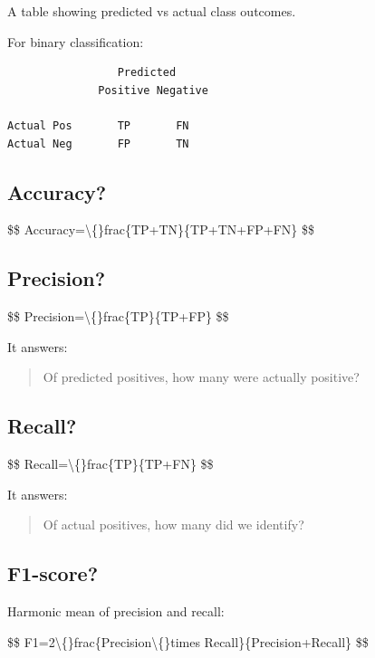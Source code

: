 A table showing predicted vs actual class outcomes.

For binary classification:

\begin{lstlisting}
                 Predicted
              Positive Negative

Actual Pos       TP       FN
Actual Neg       FP       TN
\end{lstlisting}

\medskip

\subsection{Accuracy?}

\$\$
Accuracy=\textbackslash\{\}frac\{TP+TN\}\{TP+TN+FP+FN\}
\$\$

\medskip

\subsection{Precision?}

\$\$
Precision=\textbackslash\{\}frac\{TP\}\{TP+FP\}
\$\$

It answers:

\begin{quote}
Of predicted positives, how many were actually positive?\\
\end{quote}

\medskip

\subsection{Recall?}

\$\$
Recall=\textbackslash\{\}frac\{TP\}\{TP+FN\}
\$\$

It answers:

\begin{quote}
Of actual positives, how many did we identify?\\
\end{quote}

\medskip

\subsection{F1-score?}

Harmonic mean of precision and recall:

\$\$
F1=2\textbackslash\{\}frac\{Precision\textbackslash\{\}times Recall\}\{Precision+Recall\}
\$\$

